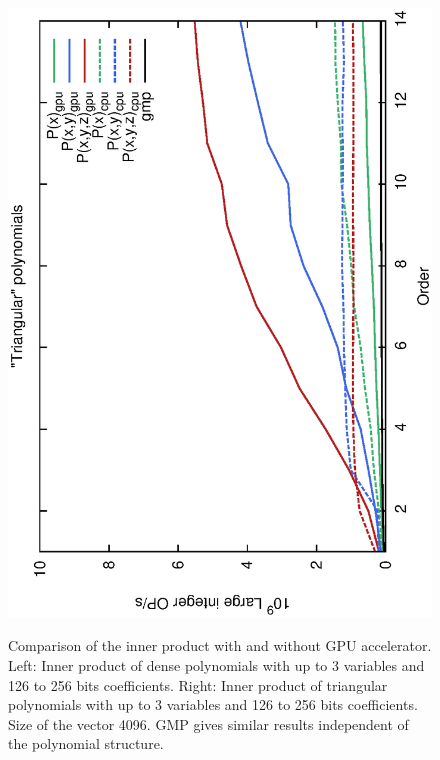 \documentclass[oribibl]{llncs2e/llncs}
\begin{document}
\begin{itemize}
\begin{figure}[t!]
\begin{center}
{        \hspace{-0.4cm}
        \includegraphics[scale=0.37, angle=-90]{MC128.eps} 
    }
    \caption{Comparison of the inner product with and without GPU accelerator. Left: Inner product of dense polynomials with up to 3 variables and 126 to 256 bits coefficients. Right: Inner product of triangular polynomials with up to 3 variables and 126 to 256 bits coefficients. Size of the vector 4096. GMP gives similar results independent of the polynomial structure.}
    \label{ResME}
    \end{center}
\end{figure}


\end{itemize}
\end{document}

